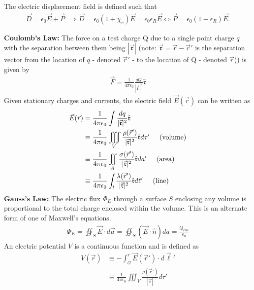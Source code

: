 The electric displacement field is defined such that
\begin{align}
	\vec{D} = \epsilon_0\vec{E}+\vec{P} \implies \vec{D} = \epsilon_0(1+\chi_e)\vec{E}=\epsilon_0 \epsilon_R \vec{E}\Longleftrightarrow \vec{P} = \epsilon_0(1-\epsilon_R)\vec{E}.
\end{align}
\begin{multicols}{2}
\textbf{Coulomb's Law:} The force on a test charge Q due to a single point charge $q$ with the separation between them being $|\vec{\mathfrak{r}}|$ (note: $\vec{\mathfrak{r}}=\vec{r}-\vec{r}'$ is the separation vector from the location of $q$ - denoted $\vec{r}'$ - to the location of Q - denoted $\vec{r}$)) is given by
\begin{align}
	\vec{F} = \frac{1}{4\pi\epsilon_0}\frac{qQ}{|\vec{\mathfrak{r}}|^2}\hat{\mathfrak{r}}
\end{align}
Given stationary charges and currents, the electric field $\vec{E}(\vec{r})$ can be written as
\begin{align}
	\vec{E}(\vec{r}) &= \frac{1}{4\pi\epsilon_0}\int \frac{dq}{|\vec{\mathfrak{r}}|^2}\hat{\mathfrak{r}} \\
	&\equiv \frac{1}{4\pi\epsilon_0}\iiint_V \frac{\rho(\vec{r}')}{|\vec{\mathfrak{r}}|^2}\hat{\mathfrak{r}}d\tau'\hspace{0.5cm}\textrm{(volume)}\\
	&\equiv \frac{1}{4\pi\epsilon_0}\iint_A \frac{\sigma(\vec{r}')}{|\vec{\mathfrak{r}}|^2}\hat{\mathfrak{r}}da'\hspace{0.5cm}\textrm{(area)}\\
	&\equiv \frac{1}{4\pi\epsilon_0}\int_l \frac{\lambda(\vec{r}')}{|\vec{\mathfrak{r}}|^2}\hat{\mathfrak{r}}d\ell'\hspace{0.5cm}\textrm{(line)}
\end{align}
\textbf{Gauss's Law:} The electric flux $\Phi_E$ through a surface $S$ enclosing any volume is proportional to the total charge enclosed within the volume. This is an alternate form of one of Maxwell's equations.
\begin{align}
	\Phi_E = \oiint_S \vec{E} \cdot d\vec{a} = \oiint_S (\vec{E} \cdot \hat{n}) da = \frac{Q_{enc}}{\epsilon_0}
\end{align}
An electric potential $V$ is a continuous function and is defined as
\begin{align}
	V(\vec{r}) &\equiv -\int_{\mathcal{O}}^{r}\vec{E}(\vec{r}')\cdot d\vec{\ell}' \\ &\equiv \frac{1}{4\pi\epsilon_0}\iiint_V \frac{\rho(\vec{r}')}{|\vec{\mathfrak{r}}|}d\tau'

\end{align}
\end{multicols}
